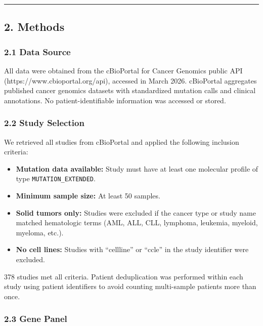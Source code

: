 \documentclass[
  11pt,
]{article}
\providecommand{\tightlist}{%
  \setlength{\itemsep}{0pt}\setlength{\parskip}{0pt}}
\begin{document}
\begin{center}\rule{0.5\linewidth}{0.5pt}\end{center}

\subsection{2. Methods}\label{methods}

\subsubsection{2.1 Data Source}\label{data-source}

All data were obtained from the cBioPortal for Cancer Genomics public
API (https://www.cbioportal.org/api), accessed in March 2026. cBioPortal
aggregates published cancer genomics datasets with standardized mutation
calls and clinical annotations. No patient-identifiable information was
accessed or stored.

\subsubsection{2.2 Study Selection}\label{study-selection}

We retrieved all studies from cBioPortal and applied the following
inclusion criteria:

\begin{itemize}
\tightlist
\item
  \textbf{Mutation data available:} Study must have at least one
  molecular profile of type \texttt{MUTATION\_EXTENDED}.
\item
  \textbf{Minimum sample size:} At least 50 samples.
\item
  \textbf{Solid tumors only:} Studies were excluded if the cancer type
  or study name matched hematologic terms (AML, ALL, CLL, lymphoma,
  leukemia, myeloid, myeloma, etc.).
\item
  \textbf{No cell lines:} Studies with ``cellline'' or ``ccle'' in the
  study identifier were excluded.
\end{itemize}

378 studies met all criteria. Patient deduplication was performed within
each study using patient identifiers to avoid counting multi-sample
patients more than once.

\subsubsection{2.3 Gene Panel}\label{gene-panel}
\end{document}
